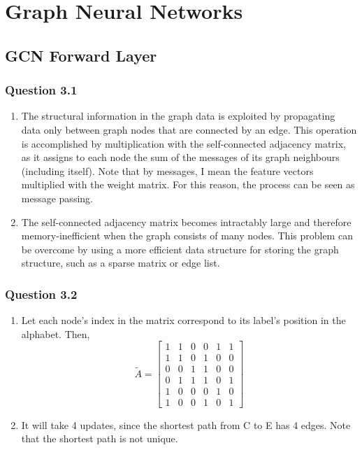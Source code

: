 \documentclass{article}
\begin{document}
\section{Graph Neural Networks}
\subsection{GCN Forward Layer}
\subsubsection*{Question 3.1}
\begin{enumerate}[label=(\alph*)]
	\item The structural information in the graph data is exploited by propagating data only between graph nodes that are connected by an edge. This operation is accomplished by multiplication with the self-connected adjacency matrix, as it assigns to each node the sum of the messages of its graph neighbours (including itself). Note that by messages, I mean the feature vectors multiplied with the weight matrix. For this reason, the process can be seen as message passing. 
	\item The self-connected adjacency matrix becomes intractably large and therefore memory-inefficient when the graph consists of many nodes. This problem can be overcome by using a more efficient data structure for storing the graph structure, such as a sparse matrix or edge list.
\end{enumerate}
\subsubsection*{Question 3.2}
\begin{enumerate}[label=(\alph*)]
	\item Let each node's index in the matrix correspond to its label's position in the alphabet. Then, $$\tilde{A} = \begin{bmatrix}
	1 & 1 & 0 & 0 & 1 & 1 \\
	1 & 1 & 0 & 1 & 0 & 0 \\
	0 & 0 & 1 & 1 & 0 & 0 \\
	0 & 1 & 1 & 1 & 0 & 1 \\
	1 & 0 & 0 & 0 & 1 & 0 \\
	1 & 0 & 0 & 1 & 0 & 1
	\end{bmatrix}$$
	\item It will take 4 updates, since the shortest path from C to E has 4 edges. Note that the shortest path is not unique. 
\end{enumerate}
\end{document}
